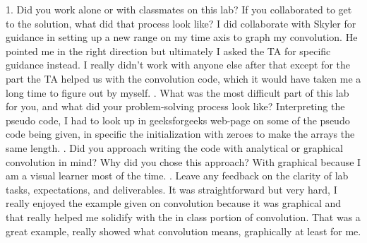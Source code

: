 \documentclass[12pt,a4paper]{article}
\begin{document}
1. Did you work alone or with classmates on this lab? If you collaborated to get to the solution,
what did that process look like?
\newline
I did collaborate with Skyler for guidance in setting up a new range on my time axis to graph my convolution. He pointed me in the right direction but ultimately I asked the TA for specific guidance instead. I really didn't work with anyone else after that except for the part the TA helped us with the convolution code, which it would have taken me a long time to figure out by myself.
. What was the most difficult part of this lab for you, and what did your problem-solving process look like?
\newline
Interpreting the pseudo code, I had to look up in geeksforgeeks web-page on some of the pseudo code being given, in specific the initialization with zeroes to make the arrays the same length.
. Did you approach writing the code with analytical or graphical convolution in mind? Why did you chose this approach?
\newline
With graphical because I am a visual learner most of the time.
. Leave any feedback on the clarity of lab tasks, expectations, and deliverables.
\newline
It was straightforward but very hard, I really enjoyed the example given on convolution because it was graphical and that really helped me solidify with the in class portion of convolution. That was a great example, really showed what convolution means, graphically at least for me. 















\end{document}
